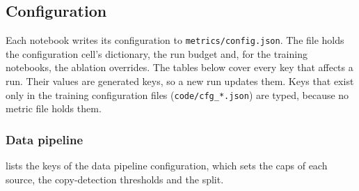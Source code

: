 \FloatBarrier

\subsection{Configuration}\label{sec:app-cfg}

Each notebook writes its configuration to \texttt{metrics/config.json}. The file holds the configuration cell's dictionary, the run budget and, for the training notebooks, the ablation overrides. The tables below cover every key that affects a run. Their values are generated keys, so a new run updates them. Keys that exist only in the training configuration files (\texttt{code/cfg\_*.json}) are typed, because no metric file holds them.

\subsubsection{Data pipeline}\label{sec:app-cfg-data}

 lists the keys of the data pipeline configuration, which sets the caps of each source, the copy-detection thresholds and the split.

